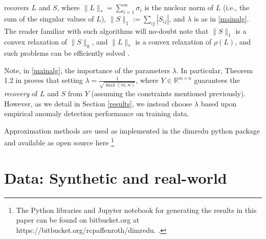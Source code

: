 \documentclass[conference]{IEEEtran}
\begin{document}
\noindent recovers $L$ and $S$, where
$\|L\|_{*} = \sum_{i=1}^m\sigma_{i}$ is the nuclear norm of $L$ (i.e.,
the sum of the singular values of $L$),
$\|S\|_1:= \sum_{ij}|S_{ij}|$, and $\lambda$ is as in \eqref{mainalg}.  The reader familiar
with such algorithms will no-doubt note that $\|S\|_1$ is a convex
relaxation of $\|S\|_0$, and $\|L\|_*$ is a convex relaxation of
$\rho(L)$, and such problems can be efficiently solved
\cite{Boyd2010a, Candes2009, Candes2011, Paffenroth2012a,
  Paffenroth2013b, Halko2011}.

Note, in \eqref{mainalg}, the importance of the parameters $\lambda$.  
In particular, Theorem 1.2 in \cite{Candes2011}
proves that setting $\lambda = \frac{1}{\sqrt{\max(m,n)}}$, where
$Y \in \mathbb{R}^{m \times n}$ guarantees the \emph{recovery} of $L$
and $S$ from $Y$ (assuming the constraints mentioned previously).  However, as we detail in Section \ref{results}, we instead choose $\lambda$ based upon empirical anomaly detection performance on training data.

Approximation methods are used as implemented in the dimredu python package and available as open source here
\footnote{The Python libraries and Jupyter notebook for generating the results in this paper can be found on bitbucket.org at  https://bitbucket.org/rcpaffenroth/dimredu. %
.}

\section{Data: Synthetic and real-world}
\end{document}
